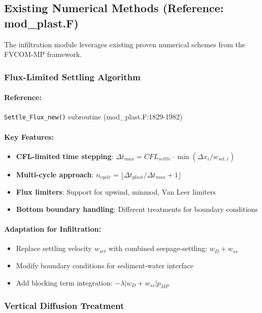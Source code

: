 \documentclass[11pt,a4paper]{article}
\begin{document}
\subsection{Existing Numerical Methods (Reference: mod\_plast.F)}

The infiltration module leverages existing proven numerical schemes from the FVCOM-MP framework.

\subsubsection{Flux-Limited Settling Algorithm}

\paragraph{Reference:} \texttt{Settle\_Flux\_new()} subroutine (mod\_plast.F:1829-1982)

\paragraph{Key Features:}
\begin{itemize}
    \item \textbf{CFL-limited time stepping}: $\Delta t_{max} = CFL_{settle} \cdot \min(\Delta x_i/w_{set,i})$
    \item \textbf{Multi-cycle approach}: $n_{cycle} = \lfloor \Delta t_{plast}/\Delta t_{max} + 1 \rfloor$
    \item \textbf{Flux limiters}: Support for upwind, minmod, Van Leer limiters
    \item \textbf{Bottom boundary handling}: Different treatments for boundary conditions
\end{itemize}

\paragraph{Adaptation for Infiltration:}
\begin{itemize}
    \item Replace settling velocity $w_{set}$ with combined seepage-settling: $w_D + w_{ss}$
    \item Modify boundary conditions for sediment-water interface
    \item Add blocking term integration: $-\lambda|w_D + w_{ss}|p_{MP}$
\end{itemize}

\subsubsection{Vertical Diffusion Treatment}
\end{document}
